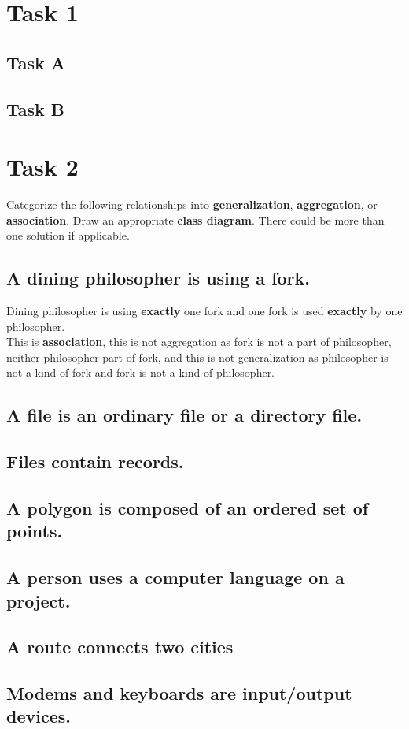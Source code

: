 \documentclass[12pt]{article}
\begin{document}
\section{Task 1}

\subsection{Task A}

\subsection{Task B}

\section{Task 2}
Categorize the following relationships into \textbf{generalization},  \textbf{aggregation}, or  \textbf{association}. Draw an appropriate  \textbf{class diagram}. There could be more than one solution if applicable. 


\subsection{A dining philosopher is using a fork.}
Dining philosopher is using \textbf{exactly} one fork and one fork is used \textbf{exactly} by one philosopher. \\ 
This is \textbf{association}, this is not aggregation as fork is not a part of philosopher, neither philosopher part of fork, and this is not generalization as philosopher is not a kind of fork and fork is not a kind of philosopher.
\subsection{A file is an ordinary file or a directory file. } 

\subsection{Files contain records.}

\subsection{A polygon is composed of an ordered set of points. }

\subsection{A person uses a computer language on a project. }

\subsection{A route connects two cities }

\subsection{Modems and keyboards are input/output devices. }
\end{document}
